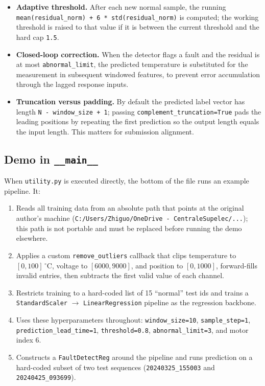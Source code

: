 \documentclass[11pt,a4paper]{article}
\begin{document}
\begin{itemize}[leftmargin=1.4em]
  \item \textbf{Adaptive threshold.} After each new normal sample, the running
        \texttt{mean(residual\_norm) + 6 * std(residual\_norm)} is computed;
        the working threshold is raised to that value if it is between the
        current threshold and the hard cap \texttt{1.5}.
  \item \textbf{Closed-loop correction.} When the detector flags a fault and
        the residual is at most \texttt{abnormal\_limit}, the predicted
        temperature is substituted for the measurement in subsequent
        windowed features, to prevent error accumulation through the lagged
        response inputs.
  \item \textbf{Truncation versus padding.} By default the predicted label
        vector has length \texttt{N - window\_size + 1}; passing
        \texttt{complement\_truncation=True} pads the leading positions by
        repeating the first prediction so the output length equals the input
        length. This matters for submission alignment.
\end{itemize}

\subsection{Demo in \texttt{\_\_main\_\_}}
\label{sec:demo}

When \texttt{utility.py} is executed directly, the bottom of the file runs an
example pipeline. It:

\begin{enumerate}[leftmargin=1.4em]
  \item Reads all training data from an absolute path that points at the
        original author's machine
        (\texttt{C:/Users/Zhiguo/OneDrive\,-\,CentraleSupelec/...}); this path
        is not portable and must be replaced before running the demo
        elsewhere.
  \item Applies a custom \texttt{remove\_outliers} callback that clips
        temperature to $[0, 100]$\,$^\circ$C, voltage to $[6000, 9000]$, and
        position to $[0, 1000]$, forward-fills invalid entries, then subtracts
        the first valid value of each channel.
  \item Restricts training to a hard-coded list of 15 ``normal'' test ids and
        trains a \texttt{StandardScaler} $\to$ \texttt{LinearRegression}
        pipeline as the regression backbone.
  \item Uses these hyperparameters throughout: \texttt{window\_size=10},
        \texttt{sample\_step=1}, \texttt{prediction\_lead\_time=1},
        \texttt{threshold=0.8}, \texttt{abnormal\_limit=3}, and motor
        index 6.
  \item Constructs a \texttt{FaultDetectReg} around the pipeline and runs
        prediction on a hard-coded subset of two test sequences
        (\texttt{20240325\_155003} and \texttt{20240425\_093699}).
\end{enumerate}
\end{document}
